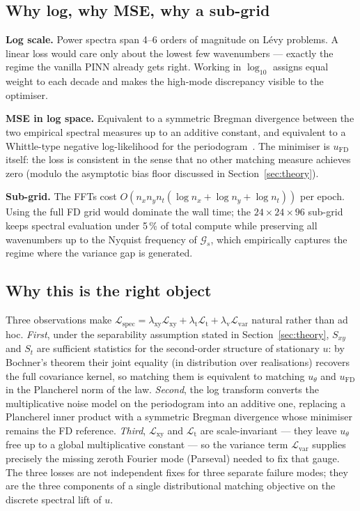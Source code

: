\documentclass[review,12pt]{elsarticle}
\begin{document}
\subsection{Why log, why MSE, why a sub-grid}

\textbf{Log scale.} Power spectra span 4--6 orders of magnitude on
L\'evy problems. A linear loss would care only about the lowest few
wavenumbers --- exactly the regime the vanilla PINN already gets
right. Working in \(\log_{10}\) assigns equal weight to each decade
and makes the high-mode discrepancy visible to the optimiser.

\textbf{MSE in log space.} Equivalent to a symmetric Bregman
divergence between the two empirical spectral measures up to an
additive constant, and equivalent to a Whittle-type negative
log-likelihood for the periodogram~\cite{Whittle1953,Dahlhaus1996}.
The minimiser is \(u_{\mathrm{FD}}\) itself: the loss is consistent
in the sense that no other matching measure achieves zero (modulo
the asymptotic bias floor discussed in Section~\ref{sec:theory}).

\textbf{Sub-grid.} The FFTs cost
\(O(n_x n_y n_t (\log n_x + \log n_y + \log n_t))\) per epoch.
Using the full FD grid would dominate the wall time; the
\(24 \times 24 \times 96\) sub-grid keeps spectral evaluation under
5\,\% of total compute while preserving all wavenumbers up to the
Nyquist frequency of \(\mathcal{G}_s\), which empirically captures
the regime where the variance gap is generated.

\subsection{Why this is the right object}
\label{subsec:right-object}

Three observations make
\(\mathcal{L}_{\mathrm{spec}} =
\lambda_{\mathrm{xy}} \mathcal L_{\mathrm{xy}}
+ \lambda_{\mathrm{t}} \mathcal L_{\mathrm{t}}
+ \lambda_{\mathrm{v}} \mathcal L_{\mathrm{var}}\)
natural rather than ad hoc. \emph{First}, under the separability
assumption stated in Section~\ref{sec:theory}, \(S_{xy}\) and
\(S_t\) are sufficient statistics for the second-order structure
of stationary \(u\): by Bochner's theorem their joint equality (in
distribution over realisations) recovers the full covariance
kernel, so matching them is equivalent to matching \(u_\theta\)
and \(u_{\mathrm{FD}}\) in the Plancherel norm of the law.
\emph{Second}, the log transform converts the multiplicative noise
model on the periodogram into an additive one, replacing a
Plancherel inner product with a symmetric Bregman divergence
whose minimiser remains the FD reference. \emph{Third},
\(\mathcal L_{\mathrm{xy}}\) and \(\mathcal L_{\mathrm{t}}\) are
scale-invariant --- they leave \(u_\theta\) free up to a global
multiplicative constant --- so the variance term
\(\mathcal L_{\mathrm{var}}\) supplies precisely the missing
zeroth Fourier mode (Parseval) needed to fix that gauge. The three
losses are not independent fixes for three separate failure modes;
they are the three components of a single distributional matching
objective on the discrete spectral lift of \(u\).
\end{document}
